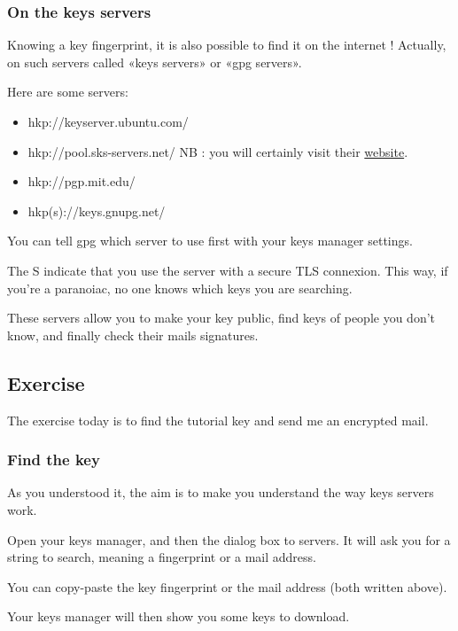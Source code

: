 \subsubsection{On the keys servers}\label{on-the-keys-servers}

Knowing a key fingerprint, it is also possible to find it on the
internet ! Actually, on such servers called «keys servers» or «gpg
servers».

Here are some servers:

\begin{itemize}
\itemsep1pt\parskip0pt
\item
  hkp://keyserver.ubuntu.com/
\item
  hkp://pool.sks-servers.net/ NB : you will certainly visit their
  \href{https://sks-keyservers.net/i/}{website}.
\item
  hkp://pgp.mit.edu/
\item
  hkp(s)://keys.gnupg.net/
\end{itemize}

You can tell gpg which server to use first with your keys manager
settings.

The S indicate that you use the server with a secure TLS connexion. This
way, if you're a paranoiac, no one knows which keys you are searching.

These servers allow you to make your key public, find keys of people you
don't know, and finally check their mails signatures.

\subsection{Exercise}\label{exercise}

The exercise today is to find the tutorial key and send me an encrypted
mail.

\subsubsection{Find the key}\label{find-the-key}

As you understood it, the aim is to make you understand the way keys
servers work.

Open your keys manager, and then the dialog box to servers. It will ask
you for a string to search, meaning a fingerprint or a mail address.

You can copy-paste the key fingerprint or the mail address (both written
above).

Your keys manager will then show you some keys to download.

